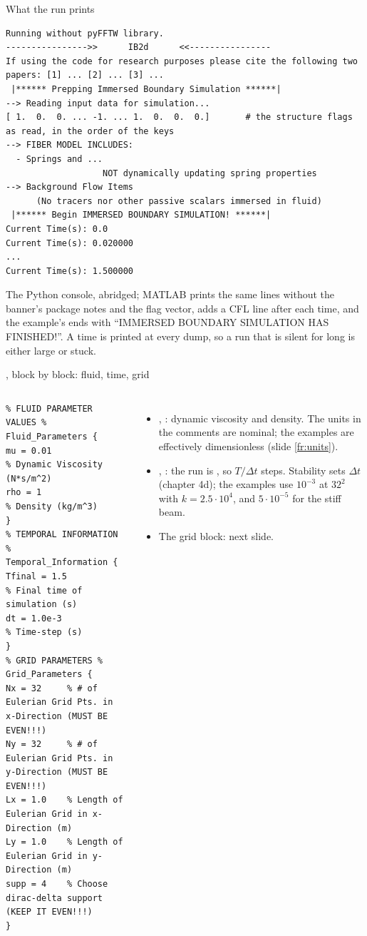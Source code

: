 \documentclass[aspectratio=169,11pt]{beamer}
\begin{document}
\begin{frame}[fragile]{What the run prints}
\label{fr:console}
\begin{lstlisting}[style=tiny]
Running without pyFFTW library.
---------------->>      IB2d      <<----------------
If using the code for research purposes please cite the following two papers: [1] ... [2] ... [3] ...
 |****** Prepping Immersed Boundary Simulation ******|
--> Reading input data for simulation...
[ 1.  0.  0. ... -1. ... 1.  0.  0.  0.]       # the structure flags as read, in the order of the keys
--> FIBER MODEL INCLUDES:
  - Springs and ...
                   NOT dynamically updating spring properties
--> Background Flow Items
      (No tracers nor other passive scalars immersed in fluid)
 |****** Begin IMMERSED BOUNDARY SIMULATION! ******|
Current Time(s): 0.0
Current Time(s): 0.020000
...
Current Time(s): 1.500000
\end{lstlisting}
\footnotesize The Python console, abridged; MATLAB prints the same lines without the banner's package notes and the flag vector, adds a CFL line after each time, and the example's  ends with ``IMMERSED BOUNDARY SIMULATION HAS FINISHED!''. A time is printed at every dump, so a run that is silent for long is either large or stuck.
\end{frame}

\begin{frame}[fragile]{, block by block: fluid, time, grid}
\label{fr:input1}
\begin{columns}[T]
\begin{lstlisting}[style=input,basicstyle=\ttfamily\tiny\color{BlackGray}]
%*****% INPUT2d FILE: %*****%
% FLUID PARAMETER VALUES %
Fluid_Parameters {
mu = 0.01               % Dynamic Viscosity (N*s/m^2)
rho = 1                 % Density (kg/m^3)
}
% TEMPORAL INFORMATION %
Temporal_Information {
Tfinal = 1.5            % Final time of simulation (s)
dt = 1.0e-3             % Time-step (s)
}
% GRID PARAMETERS %
Grid_Parameters {
Nx = 32     % # of Eulerian Grid Pts. in x-Direction (MUST BE EVEN!!!)
Ny = 32     % # of Eulerian Grid Pts. in y-Direction (MUST BE EVEN!!!)
Lx = 1.0    % Length of Eulerian Grid in x-Direction (m)
Ly = 1.0    % Length of Eulerian Grid in y-Direction (m)
supp = 4    % Choose dirac-delta support (KEEP IT EVEN!!!)
}
\end{lstlisting}
\small
\begin{itemize}
  \item {}, : dynamic viscosity and density. The units in the comments are nominal; the examples are effectively dimensionless (slide \ref{fr:units}).
  \item {}, : the run is , so $T/\Delta t$ steps. Stability sets $\Delta t$ (chapter 4d); the examples use $10^{-3}$ at $32^2$ with $k = 2.5\cdot10^4$, and $5\cdot10^{-5}$ for the stiff beam.
  \item The grid block: next slide.
\end{itemize}
\end{columns}
\end{frame}
\end{document}
